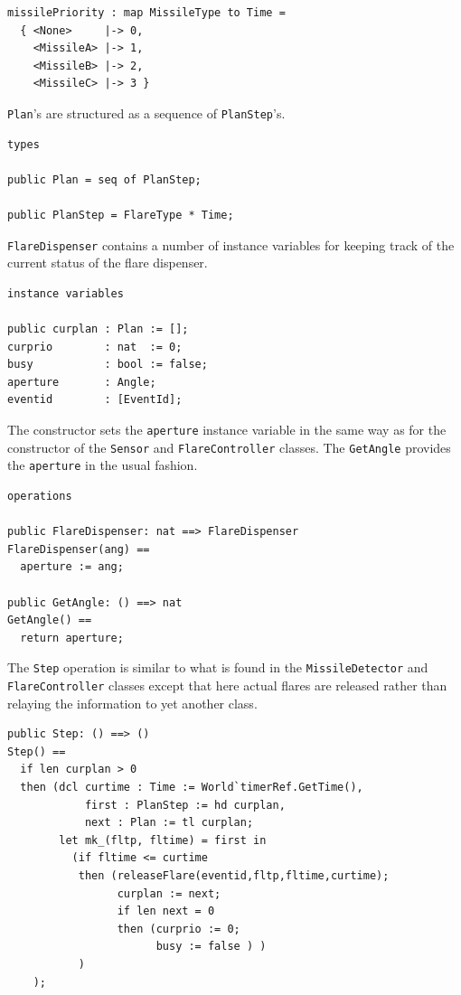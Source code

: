 \documentclass{overturerepchap}
\begin{document}
\begin{lstlisting}
missilePriority : map MissileType to Time =
  { <None>     |-> 0,
    <MissileA> |-> 1,
    <MissileB> |-> 2,
    <MissileC> |-> 3 }
\end{lstlisting}

\texttt{Plan}'s are structured as a sequence of \texttt{PlanStep}'s.

\begin{lstlisting}
types

public Plan = seq of PlanStep;

public PlanStep = FlareType * Time;
\end{lstlisting}

\texttt{FlareDispenser} contains a number of instance variables for 
keeping track of the current status of the flare dispenser.

\begin{lstlisting}
instance variables

public curplan : Plan := [];
curprio        : nat  := 0;
busy           : bool := false;
aperture       : Angle;
eventid        : [EventId];
\end{lstlisting}

The constructor sets the \texttt{aperture} instance variable in the 
same way as for the constructor of the \texttt{Sensor} and
\texttt{FlareController} classes. The \texttt{GetAngle} provides the 
\texttt{aperture} in the usual fashion.

\begin{lstlisting}
operations

public FlareDispenser: nat ==> FlareDispenser
FlareDispenser(ang) ==
  aperture := ang;

public GetAngle: () ==> nat
GetAngle() ==
  return aperture;
\end{lstlisting}

The \texttt{Step} operation is similar to what is found in the 
\texttt{MissileDetector} and \texttt{Flare\-Controller} classes except that 
here actual flares are released rather than relaying the information to
yet another class.

\begin{lstlisting}
public Step: () ==> ()
Step() ==
  if len curplan > 0
  then (dcl curtime : Time := World`timerRef.GetTime(),
            first : PlanStep := hd curplan,
            next : Plan := tl curplan;
        let mk_(fltp, fltime) = first in
          (if fltime <= curtime
           then (releaseFlare(eventid,fltp,fltime,curtime);
                 curplan := next;
                 if len next = 0
                 then (curprio := 0; 
                       busy := false ) )
           )
    );
\end{lstlisting}
\end{document}
